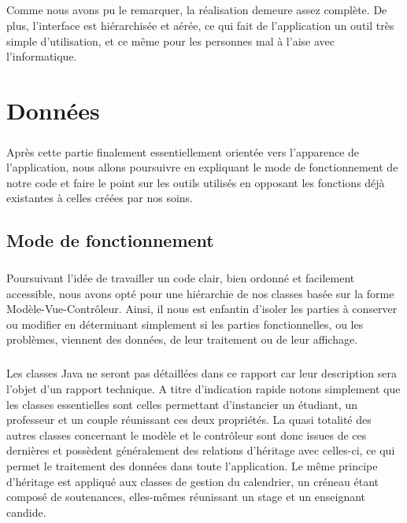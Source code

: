 \documentclass[a4paper,10pt]{report}
\begin{document}
	      \paragraph{}
		Comme nous avons pu le remarquer, la réalisation demeure assez complète.
		De plus, l'interface est hiérarchisée et aérée, ce qui fait de l'application un outil très simple d'utilisation, et ce même pour les personnes mal à l'aise avec l'informatique.
		
  \chapter{Données}
      \paragraph{}
	Après cette partie finalement essentiellement orientée vers l'apparence de l'application, nous allons poursuivre en expliquant le mode de fonctionnement de notre code et faire le point sur les outils utilisés en opposant les fonctions déjà existantes à celles créées par nos soins.
		   
    \section{Mode de fonctionnement}
      \paragraph{}
	Poursuivant l'idée de travailler un code clair, bien ordonné et facilement accessible, nous avons opté pour une hiérarchie de nos classes basée sur la forme Modèle-Vue-Contrôleur.
	Ainsi, il nous est enfantin d'isoler les parties à conserver ou modifier en déterminant simplement si les parties fonctionnelles, ou les problèmes, viennent des données, de leur traitement ou de leur affichage.
      
      \paragraph{}
	Les classes Java ne seront pas détaillées dans ce rapport car leur description sera l'objet d'un rapport technique.
	A titre d'indication rapide notons simplement que les classes essentielles sont celles permettant d'instancier un étudiant, un professeur et un couple réunissant ces deux propriétés.
	La quasi totalité des autres classes concernant le modèle et le contrôleur sont donc issues de ces dernières et possèdent généralement des relations d'héritage avec celles-ci, ce qui permet le traitement des données dans toute l'application.
	Le même principe d'héritage est appliqué aux classes de gestion du calendrier, un créneau étant composé de soutenances, elles-mêmes réunissant un stage et un enseignant candide.
	
\end{document}
